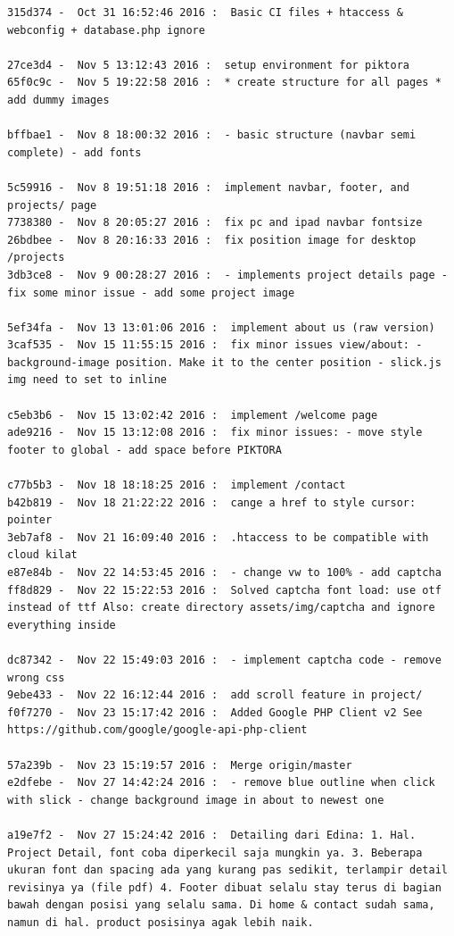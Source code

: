 \begin{lstlisting}[caption={\textit{Commit history} pada proyek Piktora},label={lst:all_commit_piktora},language=plaintext]
315d374 -  Oct 31 16:52:46 2016 :  Basic CI files + htaccess & webconfig + database.php ignore

27ce3d4 -  Nov 5 13:12:43 2016 :  setup environment for piktora
65f0c9c -  Nov 5 19:22:58 2016 :  * create structure for all pages * add dummy images

bffbae1 -  Nov 8 18:00:32 2016 :  - basic structure (navbar semi complete) - add fonts

5c59916 -  Nov 8 19:51:18 2016 :  implement navbar, footer, and projects/ page
7738380 -  Nov 8 20:05:27 2016 :  fix pc and ipad navbar fontsize
26bdbee -  Nov 8 20:16:33 2016 :  fix position image for desktop /projects
3db3ce8 -  Nov 9 00:28:27 2016 :  - implements project details page - fix some minor issue - add some project image

5ef34fa -  Nov 13 13:01:06 2016 :  implement about us (raw version)
3caf535 -  Nov 15 11:55:15 2016 :  fix minor issues view/about: - background-image position. Make it to the center position - slick.js img need to set to inline

c5eb3b6 -  Nov 15 13:02:42 2016 :  implement /welcome page
ade9216 -  Nov 15 13:12:08 2016 :  fix minor issues: - move style footer to global - add space before PIKTORA

c77b5b3 -  Nov 18 18:18:25 2016 :  implement /contact
b42b819 -  Nov 18 21:22:22 2016 :  cange a href to style cursor: pointer
3eb7af8 -  Nov 21 16:09:40 2016 :  .htaccess to be compatible with cloud kilat
e87e84b -  Nov 22 14:53:45 2016 :  - change vw to 100% - add captcha
ff8d829 -  Nov 22 15:22:53 2016 :  Solved captcha font load: use otf instead of ttf Also: create directory assets/img/captcha and ignore everything inside

dc87342 -  Nov 22 15:49:03 2016 :  - implement captcha code - remove wrong css
9ebe433 -  Nov 22 16:12:44 2016 :  add scroll feature in project/
f0f7270 -  Nov 23 15:17:42 2016 :  Added Google PHP Client v2 See https://github.com/google/google-api-php-client

57a239b -  Nov 23 15:19:57 2016 :  Merge origin/master
e2dfebe -  Nov 27 14:42:24 2016 :  - remove blue outline when click with slick - change background image in about to newest one

a19e7f2 -  Nov 27 15:24:42 2016 :  Detailing dari Edina: 1. Hal. Project Detail, font coba diperkecil saja mungkin ya. 3. Beberapa ukuran font dan spacing ada yang kurang pas sedikit, terlampir detail revisinya ya (file pdf) 4. Footer dibuat selalu stay terus di bagian bawah dengan posisi yang selalu sama. Di home & contact sudah sama, namun di hal. product posisinya agak lebih naik.


\end{lstlisting}
